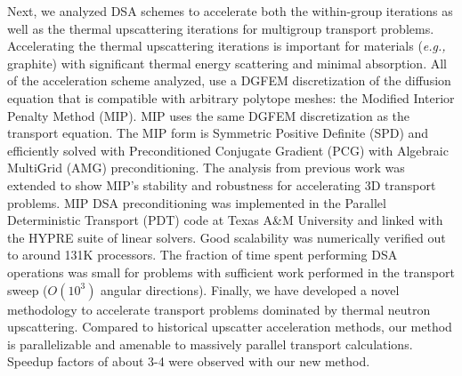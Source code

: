 Next, we analyzed DSA schemes to accelerate both the within-group iterations as well as the thermal upscattering iterations for multigroup transport problems. Accelerating the thermal upscattering iterations is important for materials ({\em e.g.,} graphite) with significant thermal energy scattering and minimal absorption. All of the acceleration scheme analyzed, use a DGFEM discretization of the diffusion equation that is compatible with arbitrary polytope meshes: the Modified Interior Penalty Method (MIP). MIP uses the same DGFEM discretization as the transport equation. The MIP form is Symmetric Positive Definite (SPD) and efficiently solved with Preconditioned Conjugate Gradient (PCG) with Algebraic MultiGrid (AMG) preconditioning. The analysis from previous work was extended to show MIP's stability and robustness for accelerating 3D transport problems. MIP DSA preconditioning was implemented in the Parallel Deterministic Transport (PDT) code at Texas A\&M University and linked with the HYPRE suite of linear solvers. Good scalability was numerically verified out to around 131K processors. The fraction of time spent performing DSA operations was small for problems with sufficient work performed in the transport sweep ($O(10^3)$ angular directions). Finally, we have developed a novel methodology to accelerate transport problems dominated by thermal neutron upscattering. Compared to historical upscatter acceleration methods, our method is parallelizable and amenable to massively parallel transport calculations. Speedup factors of about 3-4 were observed with our new method.

\pagebreak{}
